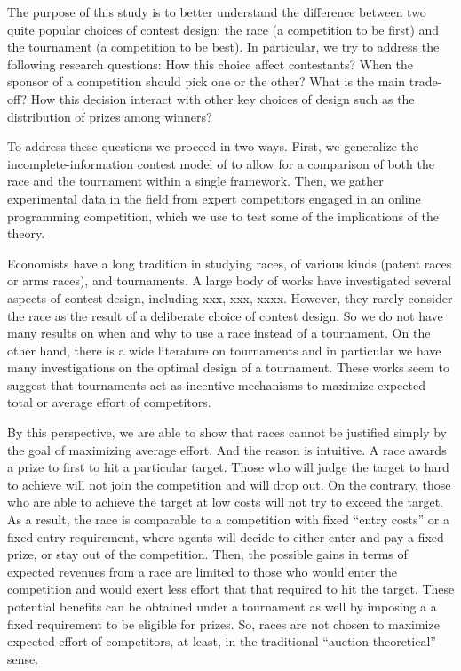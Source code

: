 \documentclass[12pt, titlepage, draft]{article} \usepackage[utf8]{inputenc}                           \usepackage[english]{babel}                           \usepackage{amsmath,amssymb,amsfonts}                 \usepackage{xcolor,tikz,graphicx,subfig}              \usepackage{rotating,multirow,array,dcolumn,booktabs} \usepackage{natbib}                                   
\begin{document}
The purpose of this study is to better understand the difference between
two quite popular choices of contest design: the race (a competition to
be first) and the tournament (a competition to be best). In particular,
we try to address the following research questions: How this choice
affect contestants? When the sponsor of a competition should pick one or
the other? What is the main trade-off? How this decision interact with
other key choices of design such as the distribution of prizes among
winners?

To address these questions we proceed in two ways. First, we generalize
the incomplete-information contest model of \citet{moldovanu2001optimal}
to allow for a comparison of both the race and the tournament within a
single framework. Then, we gather experimental data in the field from
expert competitors engaged in an online programming competition, which
we use to test some of the implications of the theory.

Economists have a long tradition in studying races, of various kinds
(patent races or arms races), and tournaments. A large body of works
have investigated several aspects of contest design, including xxx, xxx,
xxxx. However, they rarely consider the race as the result of a
deliberate choice of contest design. So we do not have many results on
when and why to use a race instead of a tournament. On the other hand,
there is a wide literature on tournaments and in particular we have many
investigations on the optimal design of a tournament. These works seem
to suggest that tournaments act as incentive mechanisms to maximize
expected total or average effort of competitors.

By this perspective, we are able to show that races cannot be justified
simply by the goal of maximizing average effort. And the reason is
intuitive. A race awards a prize to first to hit a particular target.
Those who will judge the target to hard to achieve will not join the
competition and will drop out. On the contrary, those who are able to
achieve the target at low costs will not try to exceed the target. As a
result, the race is comparable to a competition with fixed ``entry
costs'' or a fixed entry requirement, where agents will decide to either
enter and pay a fixed prize, or stay out of the competition. Then, the
possible gains in terms of expected revenues from a race are limited to
those who would enter the competition and would exert less effort that
that required to hit the target. These potential benefits can be
obtained under a tournament as well by imposing a a fixed requirement to
be eligible for prizes. So, races are not chosen to maximize expected
effort of competitors, at least, in the traditional
``auction-theoretical'' sense.
\end{document}

